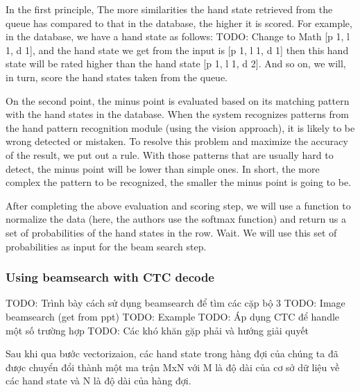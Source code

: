 In the first principle, The more similarities the hand state retrieved from the queue has compared to that in the database, the higher it is scored. For example, in the database, we have a hand state as follows: TODO: Change to Math [p 1, l 1, d 1], and the hand state we get from the input is [p 1, l 1, d 1] then this hand state will be rated higher than the hand state [p 1, l 1, d 2]. And so on, we will, in turn, score the hand states taken from the queue.

On the second point, the minus point is evaluated based on its matching pattern with the hand states in the database. When the system recognizes patterns from the hand pattern recognition module (using the vision approach), it is likely to be wrong detected or mistaken. To resolve this problem and maximize the accuracy of the result, we put out a rule. With those patterns that are usually hard to detect, the minus point will be lower than simple ones. In short, the more complex the pattern to be recognized, the smaller the minus point is going to be.

      
After completing the above evaluation and scoring step, we will use a function to normalize the data (here, the authors use the softmax function) and return us a set of probabilities of the hand states in the row. Wait. We will use this set of probabilities as input for the beam search step.

\subsubsection{ Using beamsearch with CTC decode }
TODO: Trình bày cách sử dụng beamsearch để tìm các cặp bộ 3
TODO: Image beamsearch (get from ppt)
TODO: Example
TODO: Áp dụng CTC để handle một số trường hợp
TODO: Các khó khăn gặp phải và hướng giải quyết
      
Sau khi qua bước vectorizaion, các hand state trong hàng đợi của chúng ta
đã được chuyển đổi thành một ma trận MxN với M là độ dài của cơ sở dữ liệu về
các hand state và N là độ dài của hàng đợi.
      
